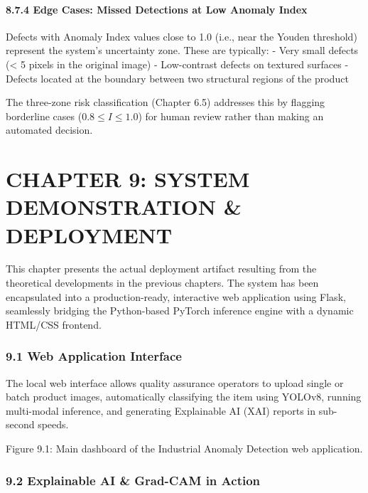 \documentclass[12pt, a4paper, oneside]{report}
\begin{document}
\subsubsection{8.7.4 Edge Cases: Missed Detections at Low Anomaly Index}\label{edge-cases-missed-detections-at-low-anomaly-index}

Defects with Anomaly Index values close to 1.0 (i.e., near the Youden threshold) represent the system's uncertainty zone. These are typically: - Very small defects (\textless{} 5 pixels in the original image) - Low-contrast defects on textured surfaces - Defects located at the boundary between two structural regions of the product

The three-zone risk classification (Chapter 6.5) addresses this by flagging borderline cases (\(0.8 \leq I \leq 1.0\)) for human review rather than making an automated decision.

\bigskip\noindent\hrulefill\bigskip

\chapter{CHAPTER 9: SYSTEM DEMONSTRATION \& DEPLOYMENT}\label{chapter-9-system-demonstration-deployment}

This chapter presents the actual deployment artifact resulting from the theoretical developments in the previous chapters. The system has been encapsulated into a production-ready, interactive web application using Flask, seamlessly bridging the Python-based PyTorch inference engine with a dynamic HTML/CSS frontend.

\subsection{9.1 Web Application Interface}\label{web-application-interface}

The local web interface allows quality assurance operators to upload single or batch product images, automatically classifying the item using YOLOv8, running multi-modal inference, and generating Explainable AI (XAI) reports in sub-second speeds.

Figure 9.1: Main dashboard of the Industrial Anomaly Detection web application.

\subsection{9.2 Explainable AI \& Grad-CAM in Action}\label{explainable-ai-grad-cam-in-action}
\end{document}

